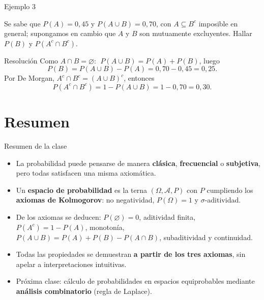 \documentclass[aspectratio=169,11pt]{beamer}
\begin{document}
\begin{frame}{Ejemplo 3}
\begin{example}
Se sabe que $P(A)=0{,}45$ y $P(A\cup B) = 0{,}70$, con $A\subseteq B^c$ imposible en general; supongamos en cambio que $A$ y $B$ son mutuamente excluyentes. Hallar $P(B)$ y $P(A^c \cap B^c)$.
\end{example}
\begin{block}{Resolución}
Como $A\cap B=\varnothing$: $\; P(A\cup B) = P(A)+P(B)$, luego
\[
P(B) = P(A\cup B)-P(A) = 0{,}70-0{,}45 = 0{,}25.
\]
Por De Morgan, $A^c\cap B^c = (A\cup B)^c$, entonces
\[
P(A^c\cap B^c) = 1-P(A\cup B) = 1-0{,}70=0{,}30.
\]
\end{block}
\end{frame}

\section{Resumen}

\begin{frame}{Resumen de la clase}
\begin{itemize}
\item La probabilidad puede pensarse de manera \textbf{clásica}, \textbf{frecuencial} o \textbf{subjetiva}, pero todas satisfacen una misma axiomática.
\item Un \textbf{espacio de probabilidad} es la terna $(\Omega,\mathcal{A},P)$ con $P$ cumpliendo los \textbf{axiomas de Kolmogorov}: no negatividad, $P(\Omega)=1$ y $\sigma$-aditividad.
\item De los axiomas se deducen: $P(\varnothing)=0$, aditividad finita, $P(A^c)=1-P(A)$, monotonía, $P(A\cup B)=P(A)+P(B)-P(A\cap B)$, subaditividad y continuidad.
\item Todas las propiedades se demuestran \textbf{a partir de los tres axiomas}, sin apelar a interpretaciones intuitivas.
\item Próxima clase: cálculo de probabilidades en espacios equiprobables mediante \textbf{análisis combinatorio} (regla de Laplace).
\end{itemize}
\end{frame}
\end{document}
